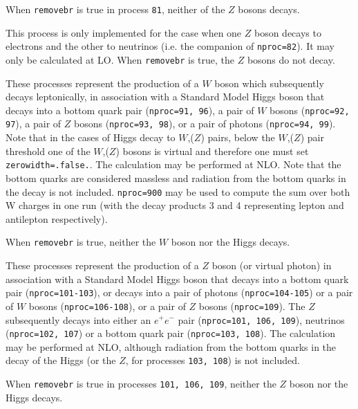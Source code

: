 When {\tt removebr} is true in process {\tt 81}, neither of the $Z$ bosons decays.



This process is only implemented for the case when one $Z$ boson decays to
electrons and the other to neutrinos (i.e. the companion of {\tt nproc=82}).
It may only be calculated at LO. When {\tt removebr} is true, the $Z$ bosons
do not decay.



\label{subsec:wh}

These processes represent the production of a $W$ boson which subsequently
decays leptonically, in association with a Standard Model Higgs boson that
decays into a bottom quark pair ({\tt nproc=91, 96}), 
a pair of $W$ bosons ({\tt nproc=92, 97}), 
a pair of $Z$ bosons ({\tt nproc=93, 98}), or a pair of photons ({\tt nproc=94, 99}).  
Note that in the cases of Higgs decay to $W$,($Z$) pairs, 
below the $W$,($Z$) pair threshold
one of the $W$,($Z$) bosons is virtual 
and therefore one must set {\tt zerowidth=.false.}.
The calculation may be performed at NLO.
Note that the bottom quarks are considered massless and radiation from the
bottom quarks in the decay is not included.
\texttt{nproc=900} may be used to compute the sum over both W charges in
one run (with the decay products 3 and 4 representing lepton and antilepton
respectively).

When {\tt removebr} is true, neither the $W$ boson nor the Higgs decays.

\label{subsec:zh}

These processes represent the production of a $Z$ boson (or virtual photon)
in association with a Standard Model Higgs boson that
decays into a bottom quark pair ({\tt nproc=101-103}),
or decays into a pair of photons ({\tt nproc=104-105}) 
or a pair of $W$ bosons ({\tt nproc=106-108}),
or a pair of $Z$ bosons ({\tt nproc=109}). 
The $Z$ subsequently decays into 
either an $e^+ e^-$ pair ({\tt nproc=101, 106, 109}), neutrinos ({\tt nproc=102, 107})
or a bottom quark pair ({\tt nproc=103, 108}).
The calculation may be performed at NLO, although radiation from the
bottom quarks in the decay of the Higgs (or the $Z$, for processes
{\tt 103, 108}) is not included.

When {\tt removebr} is true in processes {\tt 101, 106, 109}, neither the $Z$ boson
nor the Higgs decays.

